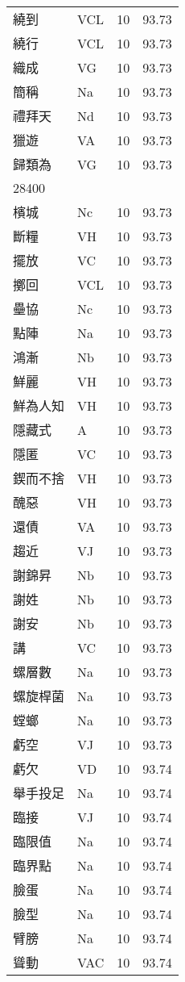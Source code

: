 \documentclass[twocolumn]{book}
\begin{document}
\begin{supertabular}{llrr}
繞到 & VCL & 10 &  93.73\\
繞行 & VCL & 10 &  93.73\\
織成 & VG & 10 &  93.73\\
簡稱 & Na & 10 &  93.73\\
禮拜天 & Nd & 10 &  93.73\\
獵遊 & VA & 10 &  93.73\\
歸類為 & VG & 10 &  93.73\\
28400\\
檳城 & Nc & 10 &  93.73\\
斷糧 & VH & 10 &  93.73\\
擺放 & VC & 10 &  93.73\\
擲回 & VCL & 10 &  93.73\\
壘協 & Nc & 10 &  93.73\\
點陣 & Na & 10 &  93.73\\
鴻漸 & Nb & 10 &  93.73\\
鮮麗 & VH & 10 &  93.73\\
鮮為人知 & VH & 10 &  93.73\\
隱藏式 & A & 10 &  93.73\\
隱匿 & VC & 10 &  93.73\\
鍥而不捨 & VH & 10 &  93.73\\
醜惡 & VH & 10 &  93.73\\
還債 & VA & 10 &  93.73\\
趨近 & VJ & 10 &  93.73\\
謝錦昇 & Nb & 10 &  93.73\\
謝姓 & Nb & 10 &  93.73\\
謝安 & Nb & 10 &  93.73\\
講 & VC & 10 &  93.73\\
螺層數 & Na & 10 &  93.73\\
螺旋桿菌 & Na & 10 &  93.73\\
螳螂 & Na & 10 &  93.73\\
虧空 & VJ & 10 &  93.73\\
虧欠 & VD & 10 &  93.74\\
舉手投足 & Na & 10 &  93.74\\
臨接 & VJ & 10 &  93.74\\
臨限值 & Na & 10 &  93.74\\
臨界點 & Na & 10 &  93.74\\
臉蛋 & Na & 10 &  93.74\\
臉型 & Na & 10 &  93.74\\
臂膀 & Na & 10 &  93.74\\
聳動 & VAC & 10 &  93.74\\

\end{supertabular}
\end{document}
